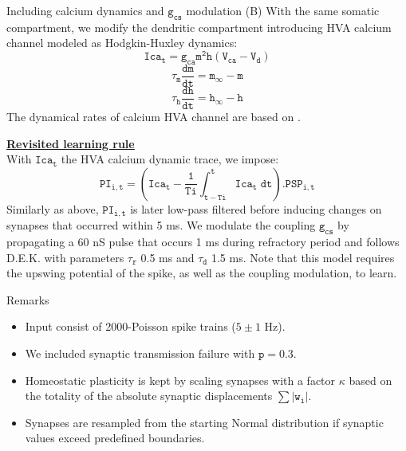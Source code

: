 \documentclass[final]{beamer}
\begin{document}
\begin{frame}
\begin{multicols}{3}
\begin{column}{.325\textwidth}
\begin{block}{Including calcium dynamics and $\mathtt{g_{cs}}$ modulation (B)}
  \justify
  With the same somatic compartment, we modify the dendritic compartment introducing HVA calcium channel modeled as Hodgkin-Huxley dynamics:
  \begin{equation*}
    \mathtt{Ica_t = g_{ca}m^2h(V_{ca}-V_d)} \nonumber
  \end{equation*}    
  \begin{equation*} 
    \mathtt{\tau_m} \mathtt{\frac{dm}{dt} = m_{\infty} - m} \nonumber
  \end{equation*}    
   \begin{equation*} 
    \mathtt{\tau_h} \mathtt{\frac{dh}{dt} = h_{\infty} - h} \nonumber 
  \end{equation*}
  The dynamical rates of calcium HVA channel are based on \cite{friedman1993}.

  \underline{\textbf{Revisited learning rule}} \\
  With $\mathtt{Ica_t}$ the HVA calcium dynamic trace, we impose:
\begin{equation}
	\mathtt{PI_{i,t} = (Ica_t - \frac{1}{Ti}\int_{t-Ti}^{t} Ica_t \; dt) . PSP_{i,t}} \nonumber
\end{equation}
  Similarly as above, $\mathtt{PI_{i,t}}$ is later low-pass filtered before inducing changes on synapses that occurred within 5 ms. We modulate the coupling $\mathtt{g_{cs}}$ by propagating a 60 nS pulse that occurs 1 ms during refractory period and follows D.E.K. with parameters $\mathtt{\tau_r}$ 0.5 ms and $\mathtt{\tau_d}$ 1.5 ms. Note that this model requires the upswing potential of the spike, as well as the coupling modulation, to learn.
\end{block}

\begin{block}{Remarks}
  \begin{itemize}
    \item Input consist of 2000-Poisson spike trains ($5 \pm 1$ Hz).
    \item We included synaptic transmission failure with $\mathtt{p = 0.3}$.
    \item Homeostatic plasticity is kept by scaling synapses with a factor $\kappa$ based on the totality of the absolute synaptic displacements $\mathtt{\sum |w_i|}$.
    \item Synapses are resampled from the starting Normal distribution if synaptic values exceed predefined boundaries.
  \end{itemize}
\end{block}


\end{column}
\end{multicols}
\end{frame}
\end{document}
